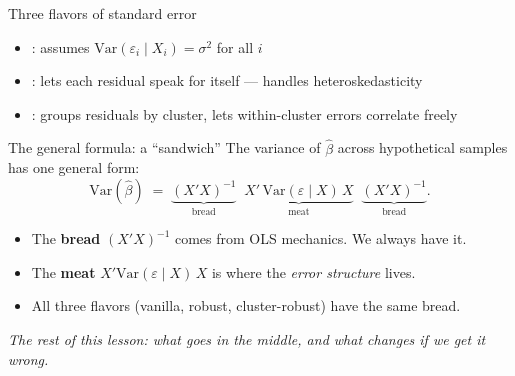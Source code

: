\documentclass[aspectratio=169,11pt]{beamer}
\begin{document}
\begin{frame}{Three flavors of standard error}
\vspace{0.6em}
\begin{itemize}
  \item {}: assumes $\text{Var}(\varepsilon_i \mid X_i) = \sigma^2$ for all $i$
  \item {}: lets each residual speak for itself --- handles heteroskedasticity
  \item {}: groups residuals by cluster, lets within-cluster errors correlate freely
\end{itemize}
\vspace{0.6em}
\end{frame}

\begin{frame}{The general formula: a ``sandwich''}
\vspace{0.4em}
The variance of $\hat\beta$ across hypothetical samples has one general form:
\vspace{-0.2em}
\[
\text{Var}(\hat\beta) \;=\; \underbrace{(X'X)^{-1}}_{\textstyle \text{bread}}\;\; \underbrace{X'\,\text{Var}(\varepsilon \mid X)\,X}_{\textstyle \text{meat}} \;\; \underbrace{(X'X)^{-1}}_{\textstyle \text{bread}}.
\]
\vspace{0.0em}
\begin{itemize}\small
  \item The \textbf{bread} $(X'X)^{-1}$ comes from OLS mechanics. We always have it.
  \item The \textbf{meat} $X' \text{Var}(\varepsilon \mid X)\, X$ is where the \textit{error structure} lives.
  \item All three flavors (vanilla, robust, cluster-robust) have the same bread. \\ 
\end{itemize}
\vspace{0.4em}
\begin{center}
\small\color{warmgray}\itshape
The rest of this lesson: what goes in the middle, and what changes if we get it wrong.
\end{center}
\end{frame}
\end{document}

